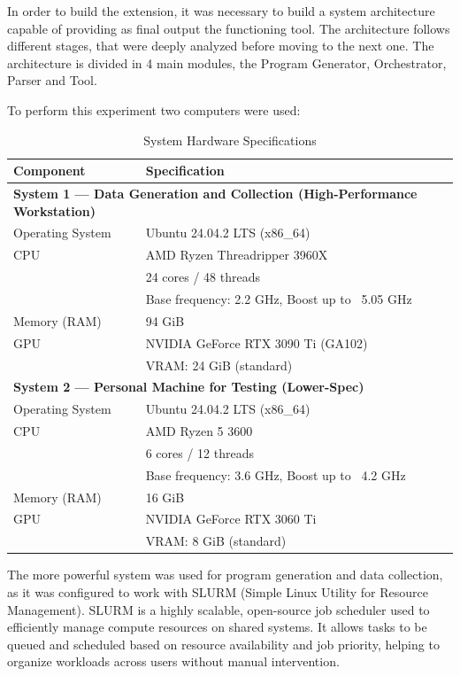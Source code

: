 In order to build the extension, it was necessary to build a system architecture capable of providing as final output the functioning tool. The architecture follows different stages, that were deeply analyzed before moving to the next one.
The architecture is divided in 4 main modules, the Program Generator, Orchestrator, Parser and Tool.

To perform this experiment two computers were used:

\begin{table}[h!]
\centering
\caption{System Hardware Specifications}
\label{tab:hardware_specs}
\begin{tabular}{|l|p{10cm}|}
\hline
\textbf{Component} & \textbf{Specification} \\
\hline
\multicolumn{2}{|l|}{\textbf{System 1 — Data Generation and Collection (High-Performance Workstation)}} \\
\hline
Operating System & Ubuntu 24.04.2 LTS (x86\_64) \\
\hline
CPU & AMD Ryzen Threadripper 3960X \\
     & 24 cores / 48 threads \\
     & Base frequency: 2.2 GHz, Boost up to ~5.05 GHz \\
\hline
Memory (RAM) & 94 GiB \\
\hline
GPU & NVIDIA GeForce RTX 3090 Ti (GA102) \\
    & VRAM: 24 GiB (standard) \\
\hline

\multicolumn{2}{|l|}{\textbf{System 2 — Personal Machine for Testing (Lower-Spec)}} \\
\hline
Operating System & Ubuntu 24.04.2 LTS (x86\_64) \\
\hline
CPU & AMD Ryzen 5 3600 \\
     & 6 cores / 12 threads \\
     & Base frequency: 3.6 GHz, Boost up to ~4.2 GHz \\
\hline
Memory (RAM) & 16 GiB \\
\hline
GPU & NVIDIA GeForce RTX 3060 Ti \\
    & VRAM: 8 GiB (standard) \\
\hline
\end{tabular}
\label{tab:hardware_specs}
\end{table}

The more powerful system was used for program generation and data collection, as it was configured to work with SLURM (Simple Linux Utility for Resource Management). SLURM is a highly scalable, open-source job scheduler used to efficiently manage compute resources on shared systems. It allows tasks to be queued and scheduled based on resource availability and job priority, helping to organize workloads across users without manual intervention.

